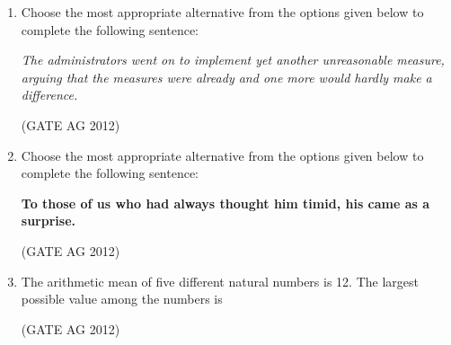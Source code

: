 \documentclass[journal]{IEEEtran}
\begin{document}
\begin{enumerate}
\medskip

\item
Choose the most appropriate alternative from the options given below to complete the following sentence:

\textit{The administrators went on to implement yet another unreasonable measure, arguing that the measures were already \underline{\hspace{1cm}} and one more would hardly make a difference.}

\begin{enumerate}
\end{enumerate}
\hfill(GATE AG 2012)\\

\medskip

\item
 Choose the most appropriate alternative from the options given below to complete the following sentence:

\textbf{To those of us who had always thought him timid, his \underline{\hspace{1cm}} came as a surprise.}

\begin{enumerate}
\end{enumerate}
\hfill(GATE AG 2012)\\

\medskip

\item
 The arithmetic mean of five different natural numbers is 12. The largest possible value among the numbers is
\begin{enumerate}
\end{enumerate}
\hfill(GATE AG 2012)\\


\end{enumerate}
\end{document}
